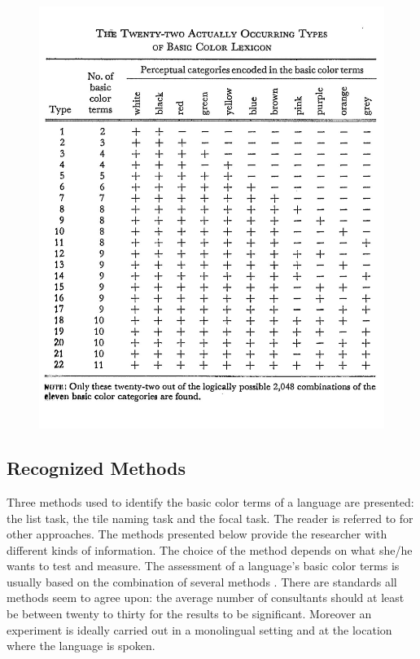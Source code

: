 \begin{figure}
  \centering
   \includegraphics[width=5in]{Graphic/Pictures/BerlKay3.jpg}
  \caption{\citealp[3]{Berl69}}
  \label{fig:berlkay3}
\end{figure}

\subsection{Recognized Methods}
\label{sec:recmeth}

Three methods used  to identify the basic color terms of a language are
presented: the list task, the tile naming task and the focal task. The reader is
referred to \cite{Lenn61, Lant64, Lenn67, Davi94, Smit93, Davi98, Borg99} for
other approaches.  The methods presented below provide the researcher with
different kinds of information. The choice of the method depends on what she/he
wants to test and measure. The assessment of a language's basic color terms
is usually based on the combination of several methods \citep[see][]{Davi92,
Corb97}. There are standards all methods seem to agree upon: the average number
of consultants should at least be between  twenty to thirty for the
results to be significant. Moreover an experiment is ideally carried out  in a
monolingual setting and at the location where the language is
spoken.


